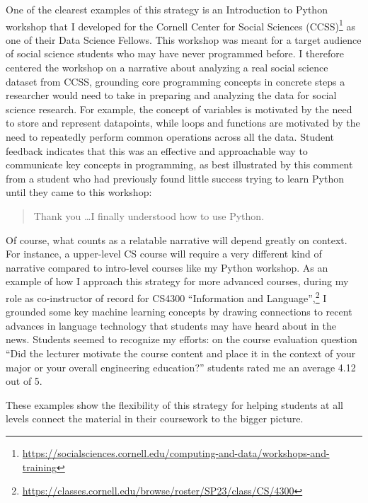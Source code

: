\documentclass[12pt,letterpaper]{article}
\newcommand\narrativeendsent\lanarrativeend
\newcommand\narrativeendsent\gennarrativeend
\begin{document}
One of the clearest examples of this strategy is an Introduction to Python workshop that I developed for the Cornell Center for Social Sciences (CCSS)\footnote{\url{https://socialsciences.cornell.edu/computing-and-data/workshops-and-training}} as one of their Data Science Fellows.
This workshop was meant for a target audience of social science students who may have never programmed before.
I therefore centered the workshop on a narrative about analyzing a real social science dataset from CCSS, grounding core programming concepts in concrete steps a researcher would need to take in preparing and analyzing the data for social science research.
For example, the concept of variables is motivated by the need to store and represent datapoints, while loops and functions are motivated by the need to repeatedly perform common operations across all the data.
Student feedback indicates that this was an effective and approachable way to communicate key concepts in programming, as best illustrated by this comment from a student who had previously found little success trying to learn Python until they came to this workshop:
\begin{quote}
    Thank you%
    {\dots}I finally understood how to use Python.
\end{quote}

Of course, what counts as a relatable narrative will depend greatly on context.
For instance, a upper-level CS course will require a very different kind of narrative compared to intro-level courses like my Python workshop.
As an example of how I approach this strategy for more advanced courses, during my role as co-instructor of record for CS4300 ``Information and Language'',\footnote{\url{https://classes.cornell.edu/browse/roster/SP23/class/CS/4300}} I grounded some key machine learning concepts by drawing connections to recent advances in language technology that students may have heard about in the news.
Students seemed to recognize my efforts: on the course evaluation question ``Did the lecturer motivate the course content
and place it in the context of your major or your overall engineering
education?'' students rated me an average 4.12 out of 5.

These examples show the flexibility of this strategy for helping students at all levels connect the material in their coursework to the bigger picture.
\narrativeendsent
\end{document}
